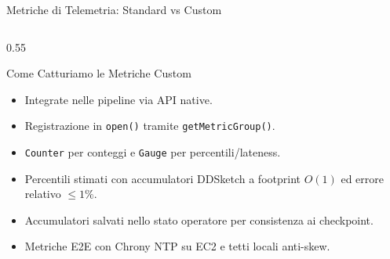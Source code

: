 \documentclass[10pt, aspectratio=169]{beamer}
\begin{document}
\begin{frame}{Metriche di Telemetria: Standard vs Custom}
\begin{columns}[T,onlytextwidth]
        \begin{column}{0.55\textwidth}
            \begin{block}{\footnotesize Come Catturiamo le Metriche Custom}
                \scriptsize
                \begin{itemize}
                    \item Integrate nelle pipeline via API native.
                    \item Registrazione in \texttt{open()} tramite \texttt{getMetricGroup()}.
                    \item \texttt{Counter} per conteggi e \texttt{Gauge} per percentili/lateness.
                    \item Percentili stimati con accumulatori DDSketch a footprint $O(1)$ ed errore relativo $\le 1\%$.
                    \item Accumulatori salvati nello stato operatore per consistenza ai checkpoint.
                    \item Metriche E2E con Chrony NTP su EC2 e tetti locali anti-skew.
                \end{itemize}
            \end{block}
        \end{column}
    \end{columns}
\end{frame}
\end{document}
